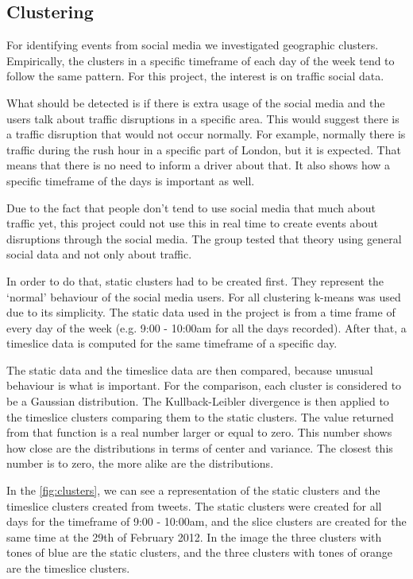 \subsection{Clustering}

For identifying events from social media we investigated geographic clusters.
Empirically, the clusters in a specific timeframe of each day of
the week tend to follow the same pattern. For this project, the interest is on
traffic social data.

What should be detected is if there is extra usage of the social media and the users talk about
traffic disruptions in a specific area. This would suggest there is a traffic
disruption that would not occur normally. For example, normally there is traffic during
the rush hour in a specific part of London, but it is expected. That means that
there is no need to inform a driver about that. It also shows how a specific
timeframe of the days is important as well.

Due to the fact that people don't tend to use social media that much about
traffic yet, this project could not use this in real time to create events
about disruptions through the social media. The group
tested that theory using general social data and not only about traffic.

In order to do that, static clusters had to be created first.
They represent the `normal' behaviour of the social media users. For all clustering
k-means\cite{website:k-means} was used due to its simplicity. The static data used in the project is
from a time frame of every day of the week (e.g. 9:00 - 10:00am for all the
days recorded). After that, a timeslice data is computed for the same timeframe
of a specific day.

The static data and the timeslice data are then compared, because unusual
behaviour is what is important. For the comparison, each cluster is considered
to be a Gaussian distribution\cite{website:gaussian}. The Kullback-Leibler
divergence\cite{Kullback} is then applied to the timeslice clusters comparing
them to the static clusters. The value returned from that function is a real
number larger or equal to zero. This number shows how close are the
distributions in terms of center and variance. The closest this number is to
zero, the more alike are the distributions.

In the \ref{fig:clusters}, we can see a representation of the static clusters and the
timeslice clusters created from tweets. The static clusters were created for
all days for the timeframe of 9:00 - 10:00am, and the slice clusters are
created for the same time at the 29th of February 2012. In the image the three
clusters with tones of blue are the static clusters, and the three clusters
with tones of orange are the timeslice clusters.

